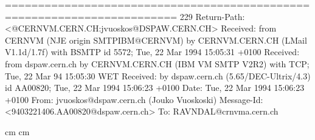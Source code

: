 ======================================================================== 229
Return-Path: <@CERNVM.CERN.CH:jvuoskos@DSPAW.CERN.CH>
Received: from CERNVM (NJE origin SMTPIBM@CERNVM) by CERNVM.CERN.CH (LMail
          V1.1d/1.7f) with BSMTP id 5572; Tue, 22 Mar 1994 15:05:31 +0100
Received: from dspaw.cern.ch by CERNVM.CERN.CH (IBM VM SMTP V2R2) with TCP;
   Tue, 22 Mar 94 15:05:30 WET
Received: by dspaw.cern.ch (5.65/DEC-Ultrix/4.3)
        id AA00820; Tue, 22 Mar 1994 15:06:23 +0100
Date: Tue, 22 Mar 1994 15:06:23 +0100
From: jvuoskos@dspaw.cern.ch (Jouko Vuoskoski)
Message-Id: <9403221406.AA00820@dspaw.cern.ch>
To: RAVNDAL@crnvma.cern.ch
 
 
 cm  cm
\oddsidemargin 0.0cm
\evensidemargin 0.0cm
\topmargin 0.0cm
\parskip=0.3cm
\parindent=0cm
\pagestyle{fancy}
\renewcommand{\sectionmark}[1]{\markboth{CADINT 1.20}{CADINT 1.20}}
\headwidth=14cm
\rhead[\fancyplain{}{\sl\leftmark}]{\fancyplain{}{\rm\thepage}}
\cfoot{}
 

